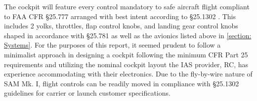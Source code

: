 The cockpit will feature every control mandatory to safe aircraft flight compliant to FAA CFR \S 25.777 arranged with best intent according to \S 25.1302 \cite{cfr}.  This includes 2 yolks, throttles, flap control knobs, and landing gear control knobs shaped in accordance with \S 25.781 as well as the avionics listed above in \ref{section: Systems}.  For the purposes of this report, it seemed prudent to follow a minimalist approach in designing a cockpit following the minimum CFR Part 25 requirements and utilizing the nominal cockpit layout the IAS provider, RC, has experience accommodating with their electronics.  Due to the fly-by-wire nature of SAM Mk. I, flight controls can be readily moved in compliance with \S 25.1302 \cite{cfr} guidelines for carrier or launch customer specifications. 

\clearpage
